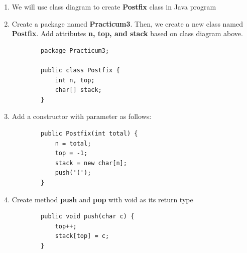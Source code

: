 \documentclass[12pt,titlepage]{article}
\begin{document}
\begin{enumerate}
    \item We will use class diagram to create \textbf{Postfix} class in Java program
    \mbox{}\\
    \item Create a package named \textbf{Practicum3}. Then, we create a new class named \textbf{Postfix}. Add attributes \textbf{n, top, and stack} based on class diagram above.
    \begin{verbatim}
        package Practicum3;

        public class Postfix {
            int n, top;
            char[] stack;
        }
    \end{verbatim}
    \item Add a constructor with parameter as follows:
    \begin{verbatim}
        public Postfix(int total) {
            n = total;
            top = -1;
            stack = new char[n];
            push('(');
        }
    \end{verbatim}
    \item Create method \textbf{push} and \textbf{pop} with void as its return type
    \begin{verbatim}
        public void push(char c) {
            top++;
            stack[top] = c;
        }


\end{verbatim}
\end{enumerate}
\end{document}

